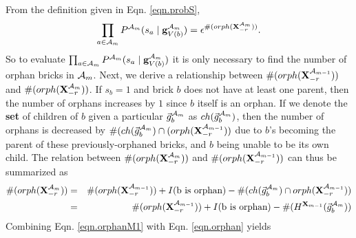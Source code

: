 \documentclass[11pt]{article}
\newcommand{\A}{{\cal A}}
\newcommand{\X}{\mathbf{X}}
\newcommand{\Xrm}{\X^{\Am}_{-r}}
\newcommand{\XrmPrev}{\X^{\A_{m-1}}_{-r}}
\newcommand{\Am}{\A_{m}}
\begin{document}
From the definition given in Eqn. \ref{eqn.probS}, 
%
\begin{eqnarray}
\prod_{a \in {\Am}} P^{\Am}(s_a \mid \mathbf{g}^{\Am}_{V({b})}) = \epsilon^{\#(orph(\Xrm))}. \label{eqn.orphan}
\end{eqnarray}
%
So to evaluate $\prod_{a \in {\Am}} P^{\Am}(s_a \mid \mathbf{g}^{\Am}_{V({b})})$ it is only necessary to find the number of orphan bricks in $\Am$.
%
Next, we derive a relationship between $\#(orph(\XrmPrev))$ and $\#(orph(\Xrm))$. If $s_b=1$ and brick $b$ does not have at least one parent, then the number of orphans increases by $1$ since $b$ itself is an orphan. If we denote the \textbf{set} of children of $b$ given a particular $\vec{g}_b^{\Am}$ as $ch(\vec{g}_b^{\Am})$, then the number of orphans is decreased by $\#(ch(\vec{g}_b^{\Am}) \cap (orph(\XrmPrev))$ due to $b$'s becoming the parent of these previously-orphaned bricks, and $b$ being unable to be its own child. The relation between $\#(orph(\Xrm))$ and $\#(orph(\XrmPrev))$ can thus be summarized as
%
\begin{eqnarray}
\#(orph(\Xrm)) &=& \#(orph(\XrmPrev)) + I(\text{b is orphan}) - \#(ch(\vec{g}_b^{\Am}) \cap orph(\XrmPrev)) \\
%
&=& \#(orph(\XrmPrev)) + I(\text{b is orphan}) - \#(H^{\X_{m-1}}(\vec{g}_b^{\Am})) \label{eqn.orphanM1}
\end{eqnarray}
%
Combining Eqn. \ref{eqn.orphanM1} with Eqn. \ref{eqn.orphan} yields
\end{document}
